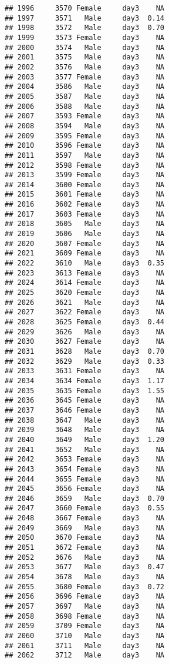 \documentclass[
]{article}
\begin{document}
\begin{verbatim}
## 1996     3570 Female     day3    NA
## 1997     3571   Male     day3  0.14
## 1998     3572   Male     day3  0.70
## 1999     3573 Female     day3    NA
## 2000     3574   Male     day3    NA
## 2001     3575   Male     day3    NA
## 2002     3576   Male     day3    NA
## 2003     3577 Female     day3    NA
## 2004     3586   Male     day3    NA
## 2005     3587   Male     day3    NA
## 2006     3588   Male     day3    NA
## 2007     3593 Female     day3    NA
## 2008     3594   Male     day3    NA
## 2009     3595 Female     day3    NA
## 2010     3596 Female     day3    NA
## 2011     3597   Male     day3    NA
## 2012     3598 Female     day3    NA
## 2013     3599 Female     day3    NA
## 2014     3600 Female     day3    NA
## 2015     3601 Female     day3    NA
## 2016     3602 Female     day3    NA
## 2017     3603 Female     day3    NA
## 2018     3605   Male     day3    NA
## 2019     3606   Male     day3    NA
## 2020     3607 Female     day3    NA
## 2021     3609 Female     day3    NA
## 2022     3610   Male     day3  0.35
## 2023     3613 Female     day3    NA
## 2024     3614 Female     day3    NA
## 2025     3620 Female     day3    NA
## 2026     3621   Male     day3    NA
## 2027     3622 Female     day3    NA
## 2028     3625 Female     day3  0.44
## 2029     3626   Male     day3    NA
## 2030     3627 Female     day3    NA
## 2031     3628   Male     day3  0.70
## 2032     3629   Male     day3  0.33
## 2033     3631 Female     day3    NA
## 2034     3634 Female     day3  1.17
## 2035     3635 Female     day3  1.55
## 2036     3645 Female     day3    NA
## 2037     3646 Female     day3    NA
## 2038     3647   Male     day3    NA
## 2039     3648   Male     day3    NA
## 2040     3649   Male     day3  1.20
## 2041     3652   Male     day3    NA
## 2042     3653 Female     day3    NA
## 2043     3654 Female     day3    NA
## 2044     3655 Female     day3    NA
## 2045     3656 Female     day3    NA
## 2046     3659   Male     day3  0.70
## 2047     3660 Female     day3  0.55
## 2048     3667 Female     day3    NA
## 2049     3669   Male     day3    NA
## 2050     3670 Female     day3    NA
## 2051     3672 Female     day3    NA
## 2052     3676   Male     day3    NA
## 2053     3677   Male     day3  0.47
## 2054     3678   Male     day3    NA
## 2055     3680 Female     day3  0.72
## 2056     3696 Female     day3    NA
## 2057     3697   Male     day3    NA
## 2058     3698 Female     day3    NA
## 2059     3709 Female     day3    NA
## 2060     3710   Male     day3    NA
## 2061     3711   Male     day3    NA
## 2062     3712   Male     day3    NA

\end{verbatim}
\end{document}
